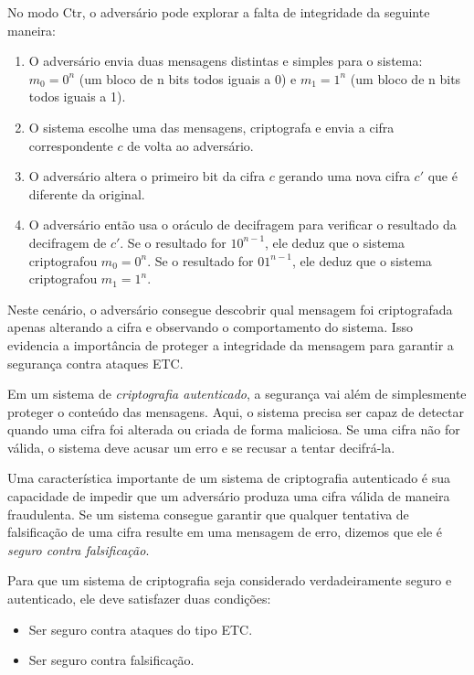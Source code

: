 \begin{example}
No modo Ctr, o adversário pode explorar a falta de integridade da seguinte maneira:
\begin{enumerate}
\item  O adversário  envia duas mensagens distintas e simples para o sistema: 
$m_0 = 0^n$ (um bloco de n bits todos iguais a 0) e $m_1 = 1^n$ (um bloco de n bits todos iguais a 1).
\item O sistema escolhe uma das mensagens, criptografa e envia a cifra correspondente $c$ de volta ao adversário.
\item O adversário altera o primeiro bit da cifra $c$ gerando uma nova cifra $c'$ que é diferente da original.
\item O adversário então usa o oráculo de decifragem para verificar o resultado da decifragem de $c'$.
  Se o resultado for $10^{n-1}$, ele deduz que o sistema criptografou $m_0 = 0^n$.
  Se o resultado for $01^{n-1}$, ele deduz que o sistema criptografou $m_1 = 1^n$.
\end{enumerate}

Neste cenário, o adversário consegue descobrir qual mensagem foi criptografada apenas alterando a cifra e observando o comportamento do sistema.
Isso evidencia a importância de proteger a integridade da mensagem para garantir a segurança contra ataques ETC.
\end{example}


Em um sistema de {\em criptografia autenticado}, a segurança vai além de simplesmente proteger o conteúdo das mensagens.
Aqui, o sistema precisa ser capaz de detectar quando uma cifra foi alterada ou criada de forma maliciosa.
Se uma cifra não for válida, o sistema deve acusar um erro e se recusar a tentar decifrá-la.

Uma característica importante de um sistema de criptografia autenticado é sua capacidade de impedir que um adversário produza uma cifra válida de maneira fraudulenta.
Se um sistema consegue garantir que qualquer tentativa de falsificação de uma cifra resulte em uma mensagem de erro, dizemos que ele é {\em seguro contra falsificação}.

Para que um sistema de criptografia seja considerado verdadeiramente seguro e autenticado, ele deve satisfazer duas condições:
\begin{itemize}
\item Ser seguro contra ataques do tipo ETC.
\item Ser seguro contra falsificação.
\end{itemize}

